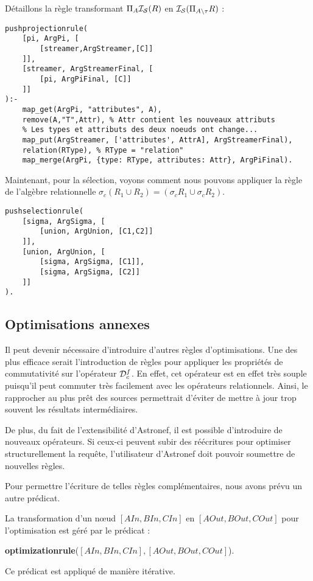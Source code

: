 \begin{example}
	Détaillons la règle transformant $\Pi_A \mathcal{I_S}(R)$ en $\mathcal{I_S}(\Pi_{A\backslash \tau} R)$ :
	\begin{lstlisting}
pushprojectionrule(
    [pi, ArgPi, [
        [streamer,ArgStreamer,[C]]
    ]],
    [streamer, ArgStreamerFinal, [
        [pi, ArgPiFinal, [C]]
    ]]
):- 
    map_get(ArgPi, "attributes", A),
    remove(A,"T",Attr), % Attr contient les nouveaux attributs
	% Les types et attributs des deux noeuds ont change...
    map_put(ArgStreamer, ['attributes', AttrA], ArgStreamerFinal),
    relation(RType), % RType = "relation"
    map_merge(ArgPi, {type: RType, attributes: Attr}, ArgPiFinal).
	\end{lstlisting}
	
	Maintenant, pour la sélection, voyons comment nous pouvons appliquer la règle de l'algèbre relationnelle $\sigma_c (R_1 \cup R_2) = (\sigma_c R_1 \cup \sigma_c R_2)$.
	\begin{lstlisting}
pushselectionrule(
    [sigma, ArgSigma, [
        [union, ArgUnion, [C1,C2]]
    ]],
    [union, ArgUnion, [
        [sigma, ArgSigma, [C1]], 
        [sigma, ArgSigma, [C2]]
    ]]
).
	\end{lstlisting}
\end{example}

\subsection{Optimisations annexes}
Il peut devenir nécessaire d'introduire d'autres règles d'optimisations. Une des plus efficace serait l'introduction de règles pour appliquer les propriétés de commutativité sur l'opérateur $\mathcal{D}_c^f$. En effet, cet opérateur est en effet très souple puisqu'il peut commuter très facilement avec les opérateurs relationnels. Ainsi, le rapprocher au plus prêt des sources permettrait d'éviter de mettre à jour trop souvent les résultats intermédiaires. 

De plus, du fait de l'extensibilité d'Astronef, il est possible d'introduire de nouveaux opérateurs. Si ceux-ci peuvent subir des réécritures pour optimiser structurellement la requête, l'utilisateur d'Astronef doit pouvoir soumettre de nouvelles règles.

Pour permettre l'écriture de telles règles complémentaires, nous avons prévu un autre prédicat.
\begin{regle}
La transformation d'un nœud $[AIn,BIn,CIn]$ en $[AOut,BOut,COut]$ pour l'optimisation est géré par le prédicat :
\begin{center} \textbf{optimizationrule}($[AIn,BIn,CIn],[AOut,BOut,COut]$).\end{center}
Ce prédicat est appliqué de manière itérative.
\end{regle}
